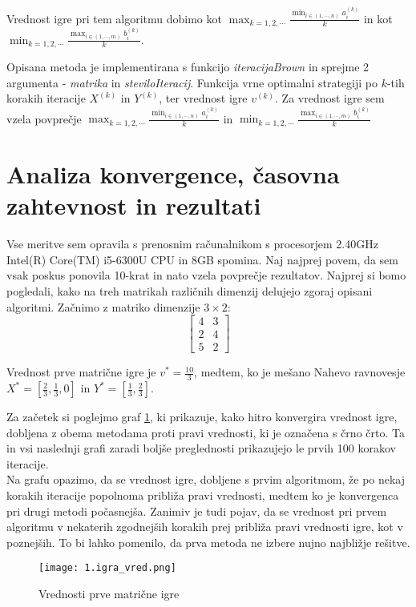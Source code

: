 \documentclass[a4paper,12pt]{article}
\begin{document}
Vrednost igre pri tem algoritmu dobimo kot $\max_{k = 1, 2, \cdots} \frac{\min_{i \in (1, \cdots, n)} a_i^{(k)}}{k}$ in kot
$\min_{k = 1, 2, \cdots} \frac{\max_{i \in (1, \cdots, m)} b_i^{(k)}}{k}$. \par
Opisana metoda je implementirana s funkcijo \textit{iteracijaBrown} in sprejme 2 argumenta - \textit{matrika} in \textit{steviloIteracij}. Funkcija vrne optimalni strategiji po $k$-tih korakih iteracije $X^{(k)}$ in  $Y^{(k)}$, ter vrednost igre $v^{(k)}$. Za vrednost igre sem vzela povprečje 
$\max_{k = 1, 2, \cdots} \frac{\min_{i \in (1, \cdots, n)} a_i^{(k)}}{k}$ in 
$\min_{k = 1, 2, \cdots} \frac{\max_{i \in (1, \cdots, m)} b_i^{(k)}}{k}$
\section{Analiza konvergence, časovna zahtevnost in rezultati}
Vse meritve sem opravila s prenosnim računalnikom s procesorjem 2.40GHz Intel(R) Core(TM) i5-6300U CPU in 8GB spomina.  
Naj najprej povem, da sem vsak poskus ponovila 10-krat in nato vzela povprečje rezultatov. 
Najprej si bomo pogledali, kako na treh matrikah različnih dimenzij delujejo zgoraj opisani algoritmi. Začnimo
z matriko dimenzije $ 3 \times 2$:
\begin{equation*}
\begin{bmatrix}
    4 & 3\\
    2 & 4\\
    5 & 2
\end{bmatrix}
\end{equation*}

Vrednost prve matrične igre je $v^* = \frac{10}{3}$, medtem, ko je mešano Nahevo ravnovesje $X^* = [\frac{2}{3}, \frac{1}{3}, 0]$ in $Y^* = [\frac{1}{3}, \frac{2}{3}]$. \par
Za začetek si poglejmo graf \ref{fig:vred1}, ki prikazuje, kako hitro konvergira vrednost igre, dobljena z obema metodama proti pravi vrednosti, ki je označena s črno 
črto. Ta in vsi naslednji grafi zaradi boljše preglednosti prikazujejo le prvih 100 korakov iteracije. \\
Na grafu opazimo, da se vrednost igre, dobljene s prvim algoritmom, že po nekaj korakih iteracije popolnoma približa pravi vrednosti, medtem ko je konvergenca pri drugi metodi počasnejša. 
Zanimiv je tudi pojav, da se vrednost pri prvem algoritmu v nekaterih zgodnejših korakih prej približa pravi vrednosti igre, kot v poznejših. To bi lahko pomenilo, da prva metoda ne izbere nujno najbližje rešitve.
\begin{figure}
    \centering
    \texttt{[image: 1.igra\_vred.png]}
    \caption{Vrednosti prve matrične igre}
    \label{fig:vred1}
  \end{figure}
\end{document}
